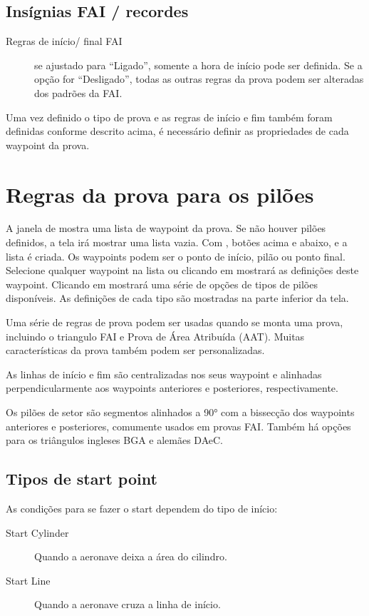 \subsection*{Insígnias FAI / recordes}
  \begin{description}
  \item [Regras de início/ final FAI] se ajustado para “Ligado”, somente a hora de início pode ser definida.  Se a opção for “Desligado”, todas as outras regras da prova podem ser alteradas dos padrões da FAI.
  \end{description}

Uma vez definido o tipo de prova e as regras de início e fim também foram definidas conforme descrito acima, é necessário definir as propriedades de cada waypoint da prova.

\section{Regras da prova para os pilões}\label{sec:task-rules}

A janela de  mostra uma lista de waypoint da prova. 
 Se não houver pilões definidos, a tela irá mostrar uma lista vazia.  Com , botões acima e abaixo, e  a lista é criada.  Os waypoints podem ser o ponto de início, pilão ou ponto final.  Selecione qualquer waypoint na lista ou clicando em  mostrará as definições deste waypoint.  Clicando em  mostrará uma série de opções de tipos de pilões disponíveis.  As definições de cada tipo são mostradas na parte inferior da tela.

Uma série de regras de prova podem ser usadas quando se monta uma prova, incluindo o triangulo FAI e Prova de Área Atribuída (AAT).  Muitas características da prova também podem ser personalizadas.

As linhas de início e fim são centralizadas nos seus waypoint e alinhadas perpendicularmente aos waypoints anteriores e posteriores, respectivamente.

Os pilões de setor são segmentos alinhados a 90° com a bissecção dos waypoints anteriores e posteriores, comumente usados em provas FAI.  Também há opções para os triângulos ingleses BGA e alemães DAeC.  

\subsection*{Tipos de start point}
As condições para se fazer o start dependem do tipo de início:
\begin{description}
\item[Start Cylinder] Quando a aeronave deixa a área do cilindro.
\item[Start Line] Quando a aeronave cruza a linha de início.
\end{description}

